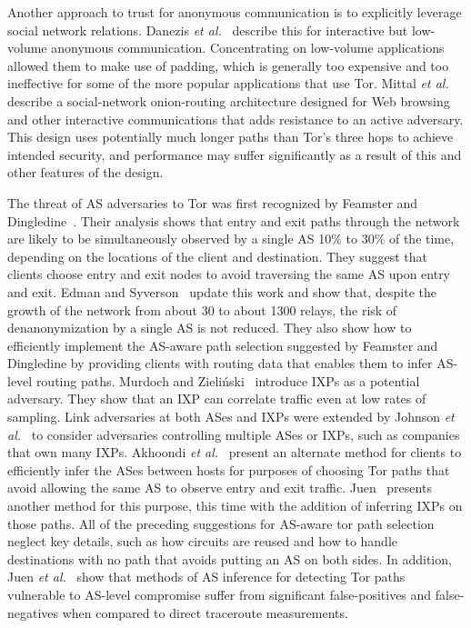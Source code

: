 \documentclass[conference]{styles/IEEEtran}
\newcommand{\etal}{\emph{et al.}}
\begin{document}
Another approach to trust for anonymous communication is to explicitly
leverage social network relations. Danezis \etal~\cite{drac-pet2010}
describe this for interactive but low-volume anonymous communication.
Concentrating on low-volume applications allowed them to make use of
padding, which is generally too expensive and too ineffective for some
of the more popular applications that use Tor. 
Mittal \etal~\cite{pisces-ndss13} describe a social-network onion-routing
architecture designed for Web browsing and other interactive
communications that adds resistance to an active
adversary. This design uses
potentially much longer paths than Tor's three hops to achieve
intended security, and performance may suffer significantly as a
result of this and other features of the design.

The threat of AS adversaries to Tor was first recognized
by Feamster and Dingledine~\cite{feamster:wpes2004}. Their analysis
shows that entry and exit paths through the network are likely to be
simultaneously observed by a single AS 10\% to 30\% of the time, depending
on the locations of the client and destination. They
suggest that clients choose entry and exit nodes to avoid traversing the same
AS upon entry and exit.
Edman and Syverson~\cite{tor-as} update this work and show that,
despite the growth of the network from
about 30 to about 1300 relays, the risk of denanonymization by a
single AS is not reduced. They also show how to efficiently implement
the AS-aware path selection suggested by Feamster and Dingledine
by providing clients with routing data that enables them to infer
AS-level routing paths.
Murdoch and Zieli\'nski~\cite{murdoch:pet2007} introduce IXPs
as a potential adversary.
They show that an IXP
can correlate traffic even at low rates of sampling.
Link adversaries at both ASes and IXPs were extended by
Johnson \etal~\cite{ccs2013-usersrouted}
to consider adversaries controlling multiple ASes or IXPs, such as
companies that own many IXPs.
Akhoondi \etal~\cite{lastor} present an alternate method for clients to
efficiently infer the ASes between hosts for purposes of choosing Tor
paths that avoid allowing the same AS to observe entry and exit traffic.
Juen~\cite{juen-masters} presents another method for this purpose,
this time with the addition of inferring IXPs on those paths. All of
the preceding suggestions for AS-aware tor path selection neglect
key details, such as how circuits are reused and how
to handle destinations with no path that avoids putting an AS on both
sides. In addition, Juen \etal~\cite{tortraceroutes-pets15} show that
methods of AS inference for detecting Tor paths vulnerable to AS-level
compromise suffer from significant false-positives and false-negatives
when compared to direct traceroute measurements.
\end{document}
